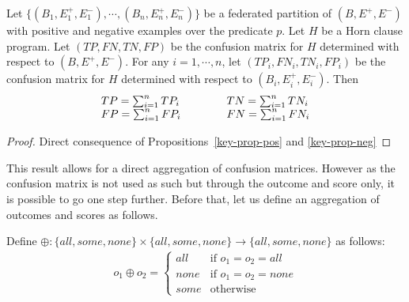 \begin{sloppypar}
\begin{proposition}
\label{prop-conf-matrices}
Let \( \{ (B_1, E_1^+,E_1^-), \cdots, (B_n, E_n^+,E_n^-) \}
\)
be a federated partition of $(B, E^+,E^-)$ with positive and negative examples over the predicate $p$. Let $H$ be a Horn clause program. Let 
$(TP,FN,TN,FP)$ be the confusion matrix for $H$ determined with respect to $(B, E^+,E^-)$. For any $i=1, \cdots, n$, let $(TP_i,FN_i,TN_i,FP_i)$ be the confusion matrix for $H$ determined with respect to $(B_i, E_i^+,E_i^-)$. Then 
\[ \begin{array}{lcl}
TP = \sum_{i=1}^{n} TP_i    & \hspace*{5ex} & TN = \sum_{i=1}^{n} TN_i \\
FP = \sum_{i=1}^{n} FP_i    & \hspace*{5ex} & FN = \sum_{i=1}^{n} FN_i
\end{array} \]
\end{proposition}
\end{sloppypar}

\begin{proof}
Direct consequence of Propositions~\ref{key-prop-pos} and \ref{key-prop-neg}
\end{proof}

This result allows for a direct aggregation of confusion matrices. However as the confusion matrix is not used as such but through the outcome and score only, it is possible to go one step further. Before that, let us define an aggregation of outcomes and scores as follows.

\begin{definition}
\label{def-aggregation}
Define 
\(\oplus : \{ \mathit{all}, \mathit{some}, \mathit{none} \}
              \times 
              \{ \mathit{all}, \mathit{some}, \mathit{none} \}
              \rightarrow
              \{ \mathit{all}, \mathit{some}, \mathit{none} \}
\)
as follows:
\begin{eqnarray*}
    o_1 \oplus o_2 = \left\{\begin{array}{ll}
                             \mathit{all} & \mbox{if } o_1 = o_2 = \mathit{all} \\
                             \mathit{none} & \mbox{if } o_1 = o_2 = \mathit{none} \\
                             \mathit{some} & \mbox{otherwise}
                           \end{array}
                     \right.
\end{eqnarray*}
\end{definition}

